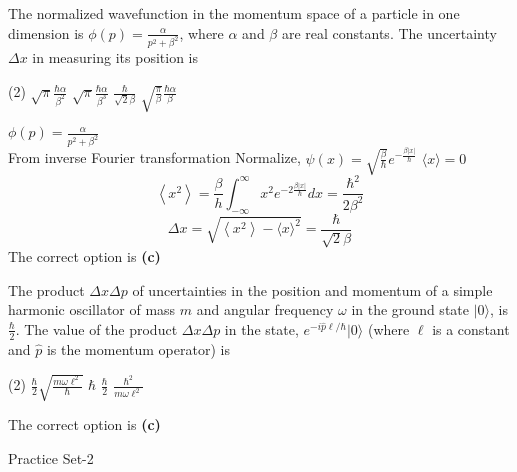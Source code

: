 \begin{enumerate}
\begin{minipage}{\textwidth}
	\item The normalized wavefunction in the momentum space of a particle in one dimension is $\phi(p)=\frac{\alpha}{p^{2}+\beta^{2}}$, where $\alpha$ and $\beta$ are real constants. The uncertainty $\Delta x$ in measuring its position is
\end{minipage}
\begin{tasks}(2)
	\task[\textbf{A.}] $\sqrt{\pi} \frac{\hbar \alpha}{\beta^{2}}$
	\task[\textbf{B.}]$\sqrt{\pi} \frac{\hbar \alpha}{\beta^{3}}$
	\task[\textbf{C.}]$\frac{\hbar}{\sqrt{2} \beta}$
	\task[\textbf{D.}]$\sqrt{\frac{\pi}{\beta}} \frac{\hbar \alpha}{\beta}$
\end{tasks}
\begin{answer}
	$\phi(p)=\frac{\alpha}{p^{2}+\beta^{2}}$\\
	From inverse Fourier transformation
	Normalize, $\psi(x)=\sqrt{\frac{\beta}{\hbar}} e^{-\frac{\beta|x|}{\hbar}}$
	$\langle x\rangle=0$
	$$
	\left\langle x^{2}\right\rangle=\frac{\beta}{h} \int_{-\infty}^{\infty} x^{2} e^{-2 \frac{\beta|x|}{\hbar}} d x=\frac{\hbar^{2}}{2 \beta^{2}}
	$$
	$$
	\Delta x=\sqrt{\left\langle x^{2}\right\rangle-\langle x\rangle^{2}}=\frac{\hbar}{\sqrt{2} \beta}
	$$
	The correct option is \textbf{(c)}
\end{answer}
\begin{minipage}{\textwidth}
	\item The product $\Delta x \Delta p$ of uncertainties in the position and momentum of a simple harmonic oscillator of mass $m$ and angular frequency $\omega$ in the ground state $|0\rangle$, is $\frac{\hbar}{2}$. The value of the product $\Delta x \Delta p$ in the state, $e^{-i \hat{p} \ell / \hbar}|0\rangle$ (where $\ell$ is a constant and $\hat{p}$ is the momentum operator) is
\end{minipage}
\begin{tasks}(2)
	\task[\textbf{A.}] $\frac{\hbar}{2} \sqrt{\frac{m \omega \ell^{2}}{\hbar}}$
	\task[\textbf{B.}]$\hbar$
	\task[\textbf{C.}] $\frac{\hbar}{2}$
	\task[\textbf{D.}] $\frac{\hbar^{2}}{m \omega \ell^{2}}$
\end{tasks}
\begin{answer}
	The correct option is \textbf{(c)}
\end{answer}
\end{enumerate}
\newpage
\begin{abox}
	Practice Set-2
\end{abox}
